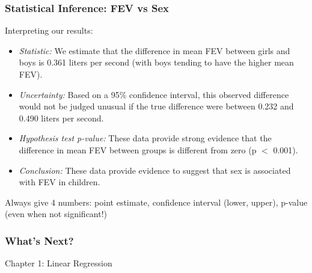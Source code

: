 \documentclass[12pt, 
hyperref={colorlinks=true, linkcolor=blue, urlcolor=cyan}]{beamer}
\begin{document}
\begin{frame}
\frametitle{Statistical Inference: FEV vs Sex}

Interpreting our results:\vspace{-0.3cm}

\begin{itemize}
\item \textit{Statistic:} We estimate that the difference in mean FEV between girls and boys is 0.361 liters per second (with boys tending to have the higher mean FEV). \pause
\item \textit{Uncertainty:} Based on a 95\% confidence interval, this observed difference would not be judged unusual if the true difference were between 0.232 and 0.490 liters per second.\pause
\item \textit{Hypothesis test p-value:} These data provide strong evidence that the difference in mean FEV between groups is different from zero (p $<$ 0.001).\pause
\item \textit{Conclusion:} These data provide evidence to suggest that sex is associated with FEV in children. \pause
\end{itemize}

\vspace{-0.3cm} \color{blue} Always give 4 numbers: \color{black} point estimate, confidence interval (lower, upper), p-value (even when not significant!)

\end{frame}


\begin{frame}
\frametitle{What's Next?}
 
\center \color{blue} \begin{LARGE} Chapter 1: Linear Regression \end{LARGE} \color{black}

\end{frame}
\end{document}
